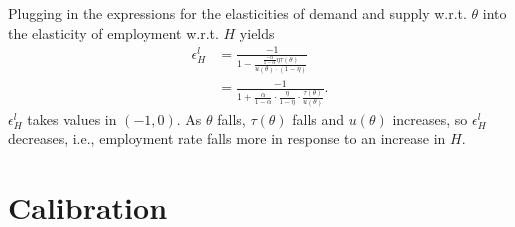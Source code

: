 \documentclass[12pt]{article}
\begin{document}
Plugging in the expressions for the elasticities of demand and supply w.r.t. $\theta$ into the elasticity of employment w.r.t. $H$ yields
\begin{align*}
    \epsilon^l_H &= \frac{-1}{1 - \frac{\frac{-\alpha}{1-\alpha} \eta \tau(\theta)}{u(\theta) \cdot (1 - \eta)}} \\
    &= \frac{-1}{1 + \frac{\alpha}{1-\alpha} \cdot \frac{\eta}{1-\eta} \cdot \frac{\tau(\theta)}{u(\theta)}}.
\end{align*}
$\epsilon^l_H$ takes values in $(-1, 0)$.
As $\theta$ falls, $\tau(\theta)$ falls and $u(\theta)$ increases, so $\epsilon^l_H$ decreases, i.e., employment rate falls more in response to an increase in $H$.


\section{Calibration}

\printbibliography
\end{document}
